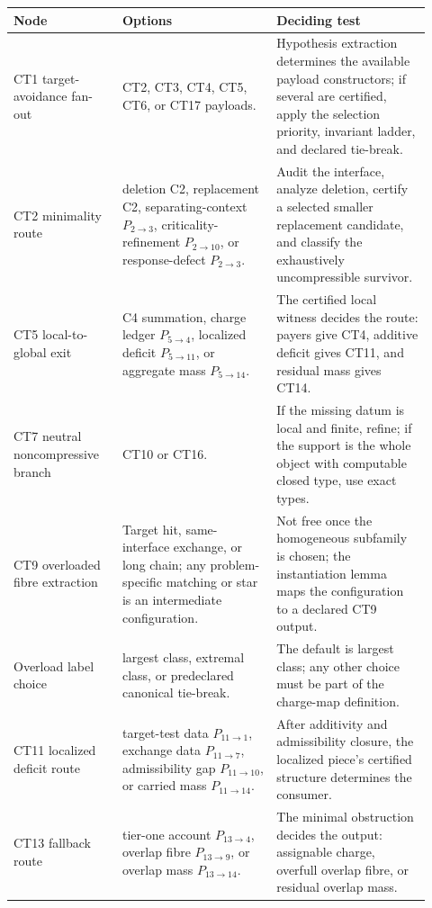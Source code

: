 \documentclass[
  11pt,
]{article}
\theoremstyle{definition}
\begin{document}
\begingroup
\small
\setlength{\tabcolsep}{2pt}
\begin{longtable}[]{@{}
  >{\raggedright\arraybackslash}p{0.24\linewidth}
  >{\raggedright\arraybackslash}p{0.34\linewidth}
  >{\raggedright\arraybackslash}p{0.34\linewidth}@{}}
\toprule\noalign{}
Node & Options & Deciding test \\
\midrule\noalign{}
\endhead
\bottomrule\noalign{}
\endlastfoot
CT1 target-avoidance fan-out & CT2, CT3, CT4, CT5, CT6, or CT17 payloads. & Hypothesis extraction determines the available payload constructors; if several are certified, apply the selection priority, invariant ladder, and declared tie-break. \\
CT2 minimality route & deletion C2, replacement C2, separating-context \(P_{2\to3}\), criticality-refinement \(P_{2\to10}\), or response-defect \(P_{2\to3}\). & Audit the interface, analyze deletion, certify a selected smaller replacement candidate, and classify the exhaustively uncompressible survivor. \\
CT5 local-to-global exit & C4 summation, charge ledger \(P_{5\to4}\), localized deficit \(P_{5\to11}\), or aggregate mass \(P_{5\to14}\). & The certified local witness decides the route: payers give CT4, additive deficit gives CT11, and residual mass gives CT14. \\
CT7 neutral noncompressive branch & CT10 or CT16. & If the missing datum is local and finite, refine; if the support is the whole object with computable closed type, use exact types. \\
CT9 overloaded fibre extraction & Target hit, same-interface exchange, or long chain; any problem-specific matching or star is an intermediate configuration. & Not free once the homogeneous subfamily is chosen; the instantiation lemma maps the configuration to a declared CT9 output. \\
Overload label choice & largest class, extremal class, or predeclared canonical tie-break. & The default is largest class; any other choice must be part of the charge-map definition. \\
CT11 localized deficit route & target-test data \(P_{11\to1}\), exchange data \(P_{11\to7}\), admissibility gap \(P_{11\to10}\), or carried mass \(P_{11\to14}\). & After additivity and admissibility closure, the localized piece's certified structure determines the consumer. \\
CT13 fallback route & tier-one account \(P_{13\to4}\), overlap fibre \(P_{13\to9}\), or overlap mass \(P_{13\to14}\). & The minimal obstruction decides the output: assignable charge, overfull overlap fibre, or residual overlap mass. \\

\end{longtable}
\end{document}
